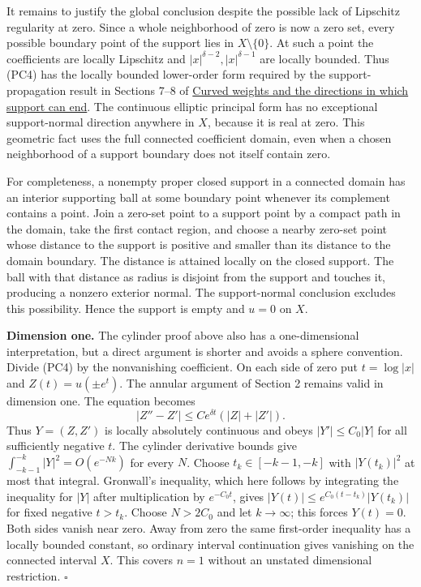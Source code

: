\documentclass[
  11pt,
]{article}
\begin{document}
It remains to justify the global conclusion despite the possible lack of
Lipschitz regularity at zero. Since a whole neighborhood of zero is now
a zero set, every possible boundary point of the support lies in
\(X\setminus\{0\}\). At such a point the coefficients are locally
Lipschitz and \(|x|^{\delta-2},|x|^{\delta-1}\) are locally bounded.
Thus (PC4) has the locally bounded lower-order form required by the
support-propagation result in Sections 7--8 of
\href{support-continuation.pdf}{Curved weights and the directions in
which support can end}. The continuous elliptic principal form has no
exceptional support-normal direction anywhere in \(X\), because it is
real at zero. This geometric fact uses the full connected coefficient
domain, even when a chosen neighborhood of a support boundary does not
itself contain zero.

For completeness, a nonempty proper closed support in a connected domain
has an interior supporting ball at some boundary point whenever its
complement contains a point. Join a zero-set point to a support point by
a compact path in the domain, take the first contact region, and choose
a nearby zero-set point whose distance to the support is positive and
smaller than its distance to the domain boundary. The distance is
attained locally on the closed support. The ball with that distance as
radius is disjoint from the support and touches it, producing a nonzero
exterior normal. The support-normal conclusion excludes this
possibility. Hence the support is empty and \(u=0\) on \(X\).

\textbf{Dimension one.} The cylinder proof above also has a
one-dimensional interpretation, but a direct argument is shorter and
avoids a sphere convention. Divide (PC4) by the nonvanishing
coefficient. On each side of zero put \(t=\log|x|\) and
\(Z(t)=u(\pm e^t)\). The annular argument of Section 2 remains valid in
dimension one. The equation becomes \[
|Z''-Z'|\leq Ce^{\delta t}(|Z|+|Z'|).
\tag{PC49}
\] Thus \(Y=(Z,Z')\) is locally absolutely continuous and obeys
\(|Y'|\leq C_0|Y|\) for all sufficiently negative \(t\). The cylinder
derivative bounds give \(\int_{-k-1}^{-k}|Y|^2=O(e^{-Nk})\) for every
\(N\). Choose \(t_k\in[-k-1,-k]\) with \(|Y(t_k)|^2\) at most that
integral. Gronwall's inequality, which here follows by integrating the
inequality for \(|Y|\) after multiplication by \(e^{-C_0t}\), gives
\(|Y(t)|\leq e^{C_0(t-t_k)}|Y(t_k)|\) for fixed negative \(t>t_k\).
Choose \(N>2C_0\) and let \(k\to\infty\); this forces \(Y(t)=0\). Both
sides vanish near zero. Away from zero the same first-order inequality
has a locally bounded constant, so ordinary interval continuation gives
vanishing on the connected interval \(X\). This covers \(n=1\) without
an unstated dimensional restriction. \(\square\)
\end{document}
